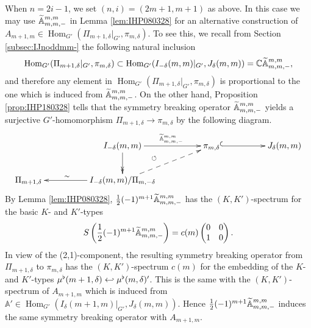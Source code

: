 \begin{remark}
\label{rem:20180406}
When $n=2i-1$, 
 we set $(n,i)=(2m+1,m+1)$ as above.  
In this case we may use ${\widetilde{\mathbb{A}}}_{{m},{m},{-}}^{{m,m}}$ in Lemma \ref{lem:IHP080328}
 for an alternative construction 
 of $A_{m+1,m} \in {\operatorname{Hom}}_{G'}(\Pi_{m+1,\delta}|_{G'}, \pi_{m,\delta})$.  
To see this, 
 we recall from Section \ref{subsec:IJnoddmm-}
 the following natural inclusion 
\[
{\operatorname{Hom}}_{G'}(\Pi_{m+1,\delta}|_{G'}, \pi_{m,\delta})
\subset
 {\operatorname{Hom}}_{G'}(I_{-\delta}(m,m)|_{G'}, J_{\delta}(m,m))
 ={\mathbb{C}} {\widetilde{\mathbb{A}}}_{{m},{m},{-}}^{{m,m}}, 
\]
and therefore any element
 in 
$
   {\operatorname{Hom}}_{G'}(\Pi_{m+1,\delta}|_{G'}, \pi_{m,\delta})
$
 is proportional to the one
 which is induced from ${\widetilde{\mathbb{A}}}_{{m},{m},{-}}^{{m,m}}$.  
On the other hand, 
 Proposition \ref{prop:IHP180328} tells 
 that the symmetry breaking operator 
 ${\widetilde{\mathbb{A}}}_{{m},{m},{-}}^{{m,m}}$ yields
 a surjective $G'$-homomorphism
 $\Pi_{m+1,\delta} \to \pi_{m,\delta}$
 by the following diagram.  
\begin{eqnarray*}
\xymatrix@C=22pt{
&&I_{-\delta}(m,m)\ar[rr]^{\quad\Atbb m m -{m,m}}
\ar@{->>}[d]
\ar@{}[dr]^\circlearrowleft
&&\pi_{m,\delta} \ar@{^{(}->}[rr]
&&J_{\delta}(m,m)
\\
\Pi_{m+1,\delta}
&&\ar[ll]_{\sim\quad\quad} I_{-\delta}(m,m)/\Pi_{m,-\delta}\ar@{-->}[urr]
&&
&&
}
\end{eqnarray*}
By Lemma \ref{lem:IHP080328}, 
 $\frac 1 2 (-1)^{m+1} {\widetilde{\mathbb{A}}}_{{m},{m},{-}}^{{m,m}}$ has 
 the $(K,K')$-spectrum 
 for the basic $K$- and $K'$-types
\[
  S\left(\frac 1 2 (-1)^{m+1} {\widetilde{\mathbb{A}}}_{{m},{m},{-}}^{{m,m}}\right) = c(m) \begin{pmatrix} 0 & 0 \\ 1 & 0\end{pmatrix}.  
\]
In view of the (2,1)-component, 
 the resulting symmetry breaking operator from $\Pi_{m+1,\delta}$ to $\pi_{m,\delta}$
 has the $(K,K')$-spectrum $c(m)$
 for the embedding 
 of the $K$- and $K'$-types
 $\mu^{\flat} (m+1,\delta) \hookleftarrow \mu^{\flat} (m,\delta)'$.  
This is the same with the $(K,K')$-spectrum of $A_{m+1,m}$
 which is induced from 
 ${\mathbb{A}}' \in {\operatorname{Hom}}_{G'}(I_{\delta}(m+1,m)|_{G'}, J_{\delta}(m,m))$.  
Hence $\frac 1 2 (-1)^{m+1} {\widetilde{\mathbb{A}}}_{{m},{m},{-}}^{{m,m}}$ induces
 the same symmetry breaking operator with $A_{m+1,m}$.  
\end{remark}

